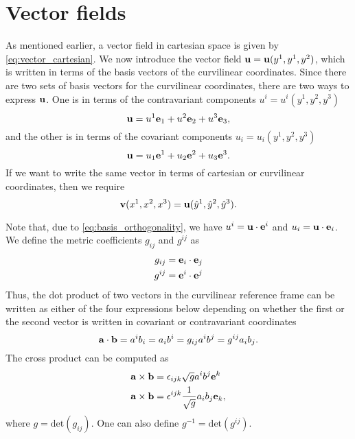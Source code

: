 \documentclass[11pt]{article}
\newcommand{\yhat}{\hat{y}}
\begin{document}
\section{Vector fields}
As mentioned earlier, a vector field in cartesian space is given by \cref{eq:vector_cartesian}. We now introduce the vector field $\mathbf{u} = \mathbf{u}(y^1, y^1, y^2)$, which is written in terms of the basis vectors of the curvilinear coordinates. Since there are two sets of basis vectors for the curvilinear coordinates, there are two ways to express $\mathbf{u}$. One is in terms of the contravariant components $u^i = u^i(y^1, y^2, y^3)$
\begin{equation}
    \mathbf{u} = u^1 \mathbf{e}_1 + u^2 \mathbf{e}_2 + u^3 \mathbf{e}_3,
\end{equation}
and the other is in terms of the covariant components $u_i = u_i(y^1, y^2, y^3)$
\begin{equation}
    \mathbf{u} = u_1 \mathbf{e}^1 + u_2 \mathbf{e}^2 + u_3 \mathbf{e}^3.
\end{equation}
If we want to write the same vector in terms of cartesian or curvilinear coordinates, then we require
\begin{equation}
    \vvec(x^1, x^2, x^3) = \uvec(\yhat^1, \yhat^2, \yhat^3).
\end{equation}

Note that, due to \cref{eq:basis_orthogonality}, we have $u^i = \mathbf{u} \cdot \mathbf{e}^i$ and $u_i = \mathbf{u} \cdot \mathbf{e}_i$. We define the metric coefficients $g_{ij}$ and $g^{ij}$ as
\begin{align}
    g_{ij} &= \mathbf{e}_i \cdot \mathbf{e}_j \\
    g^{ij} &= \mathbf{e}^i \cdot \mathbf{e}^j \\
\end{align}
Thus, the dot product of two vectors in the curvilinear reference frame can be written as either of the four expressions below depending on whether the first or the second vector is written in covariant or contravariant coordinates
\begin{equation}
\mathbf{a} \cdot \mathbf{b} = a^i b_i = a_i b^i = g_{ij} a^i b^j = g^{ij} a_i b_j.
\end{equation}
The cross product can be computed as
\begin{align}
    \mathbf{a} \times \mathbf{b} &= \epsilon_{ijk} \sqrt{g} a^i b^j \mathbf{e}^k \\
    \mathbf{a} \times \mathbf{b} &= \epsilon^{ijk} \frac{1}{\sqrt{g}} a_i b_j \mathbf{e}_k,
\end{align}
where $g = \text{det}(g_{ij})$. One can also define $g^{-1} = \text{det}(g^{ij})$.
\end{document}
